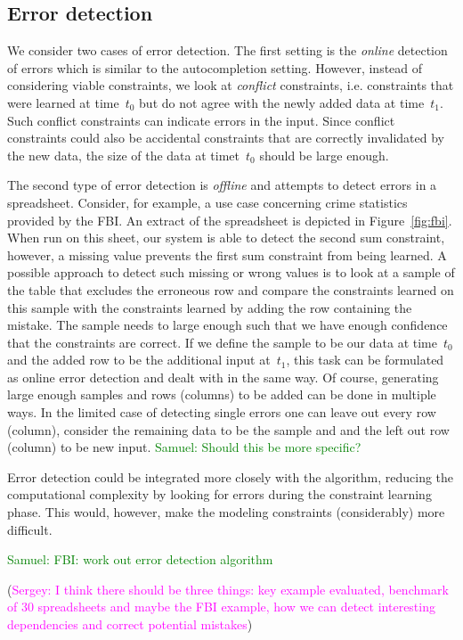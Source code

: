 \documentclass{sig-alternate-05-2015}
\newcommand{\sergey}[1]{\textcolor{magenta}{{\sc Sergey:} #1}\xspace}
\newcommand{\samuel}[1]{\textcolor{green}{{\sc Samuel:} #1}\xspace}
\begin{document}
\subsection{Error detection}
We consider two cases of error detection.
The first setting is the \textit{online} detection of errors which is similar to the autocompletion setting.
However, instead of considering viable constraints, we look at \textit{conflict} constraints, i.e. constraints that were learned at time~$t_0$ but do not agree with the newly added data at time~$t_1$.
Such conflict constraints can indicate errors in the input.
Since conflict constraints could also be accidental constraints that are correctly invalidated by the new data, the size of the data at timet~$t_0$ should be large enough.

The second type of error detection is \textit{offline} and attempts to detect errors in a spreadsheet.
Consider, for example, a use case concerning crime statistics provided by the FBI.
An extract of the spreadsheet is depicted in Figure~\ref{fig:fbi}.
When run on this sheet, our system is able to detect the second sum constraint, however, a missing value prevents the first sum constraint from being learned.
A possible approach to detect such missing or wrong values is to look at a sample of the table that excludes the erroneous row and compare the constraints learned on this sample with the constraints learned by adding the row containing the mistake.
The sample needs to large enough such that we have enough confidence that the constraints are correct.
If we define the sample to be our data at time~$t_0$ and the added row to be the additional input at~$t_1$, this task can be formulated as online error detection and dealt with in the same way.
Of course, generating large enough samples and rows (columns) to be added can be done in multiple ways.
In the limited case of detecting single errors one can leave out every row (column), consider the remaining data to be the sample and
and the left out row (column) to be new input.
\samuel{Should this be more specific?}

Error detection could be integrated more closely with the algorithm, reducing the computational complexity by looking for errors during the constraint learning phase.
This would, however, make the modeling constraints (considerably) more difficult.

\samuel{FBI: work out error detection algorithm}

(\sergey{I think there should be three things: key example evaluated, benchmark of 30 spreadsheets and maybe the FBI example, how we can detect interesting dependencies and correct potential mistakes})
\end{document}
